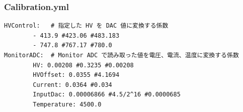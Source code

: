 \subsubsection{Calibration.yml}

\begin{shadebox}
\begin{verbatim}
HVControl:   # 指定した HV を DAC 値に変換する係数
        - 413.9 #423.06 #483.183
        - 747.8 #767.17 #780.0
MonitorADC:  # Monitor ADC で読み取った値を電圧、電流、温度に変換する係数
        HV: 0.00208 #0.3235 #0.00208
        HVOffset: 0.0355 #4.1694
        Current: 0.0364 #0.034
        InputDac: 0.00006866 #4.5/2^16 #0.0000685
        Temperature: 4500.0
\end{verbatim}
\end{shadebox}
